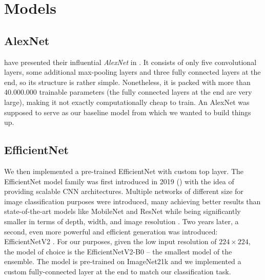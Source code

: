 \section{Models}

\subsection{AlexNet}
\citeauthor{Krizhevsky2012} have presented their influential \emph{AlexNet} in \citeyear{Krizhevsky2012}. It consists of only five convolutional layers, some additional max-pooling layers and three fully connected layers at the end, so its structure is rather simple. Nonetheless, it is packed with more than 40.000.000 trainable parameters (the fully connected layers at the end are very large), making it not exactly computationally cheap to train. An AlexNet was supposed to serve as our baseline model from which we wanted to build things up.

\subsection{EfficientNet}
We then implemented a pre-trained EfficientNet with custom top layer. The EfficientNet model family was first introduced in 2019 (\citeauthor{Tan2019}) with the idea of providing scalable CNN architectures. Multiple networks of different size for image classification purposes were introduced, many achieving better results than state-of-the-art models like MobileNet and ResNet while being significantly smaller in terms of depth, width, and image resolution \citep{Tan2019}. Two years later, a second, even more powerful and efficient generation was introduced: EfficientNetV2 \citep{Tan2021}. For our purposes, given the low input resolution of $224\times224$, the model of choice is the EfficientNetV2-B0 -- the smallest model of the ensemble. The model is pre-trained on ImageNet21k and we implemented a custom fully-connected layer at the end to match our classification task.

